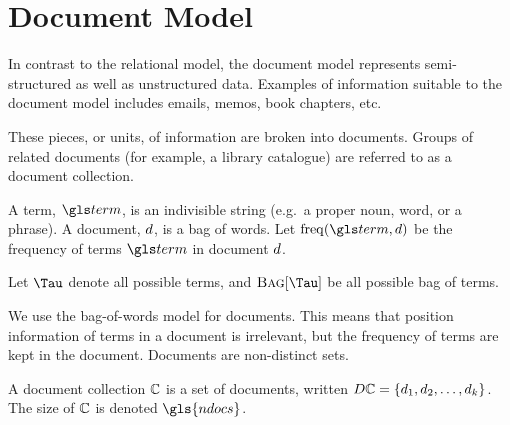 \section{Document Model}
\label{sec:document-model}
	In contrast to the relational model, the document model represents semi-structured as well as unstructured data.  Examples of information suitable to the document model includes emails, memos, book chapters, etc.
	
	These pieces, or units, of information are broken into documents.  Groups of related documents (for example, a library catalogue) are referred to as a document collection.

	\begin{defn}
	\label{def:document}
		A term, \(\term\), is an indivisible string (e.g.~a proper noun, word, or a phrase).	A document, \(d\), is a bag of words.	Let \(\freq(\term, \doc)\) be the frequency of terms \(\term\) in document \(d\).
		
		Let \(\terms\) denote all possible terms, and \(\bag{\terms}\) be all possible bag of terms.
	\end{defn}
	
	\begin{remark}
		We use the bag-of-words model for documents.  This means that position information of terms in a document is irrelevant, but the frequency of terms are kept in the document.  Documents are non-distinct sets.
	\end{remark}
	
	\begin{defn}
	\label{def:document-collection}
		A document collection \(\mathbb{C}\) is a set of documents, written \(D\mathbb{C} = \{d_1, d_2, \dotsc, d_k\}\).  The size of \(\mathbb{C}\) is denoted \(\gls{ndocs}\).
	\end{defn}
	
